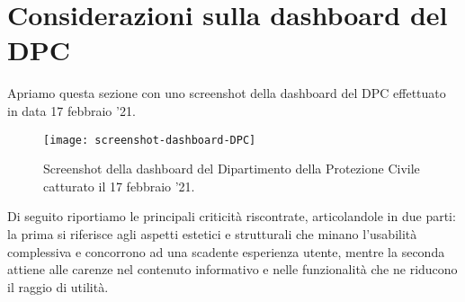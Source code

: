 \documentclass[../../main.tex]{subfiles}
\begin{document}
\section{Considerazioni sulla dashboard del DPC}\label{s:considerazioni}
Apriamo questa sezione con uno screenshot della dashboard del DPC effettuato in data 17 febbraio '21.

\begin{figure}[h]
    \centering
    \texttt{[image: screenshot-dashboard-DPC]}
    \caption{Screenshot della dashboard del Dipartimento della Protezione Civile catturato il 17 febbraio '21.}
    \label{fig:screen-dashboard-DPC}
\end{figure}

Di seguito riportiamo le principali criticità riscontrate, articolandole in due parti: la prima si riferisce agli aspetti estetici e strutturali che minano l'usabilità complessiva e concorrono ad una scadente esperienza utente, mentre la seconda attiene alle carenze nel contenuto informativo e nelle funzionalità che ne riducono il raggio di utilità.
\end{document}
